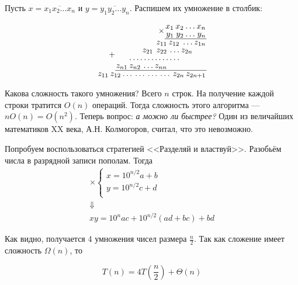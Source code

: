 \documentclass[a4paper,12pt]{article}
\begin{document}
Пусть $x = \overline{x_1 x_2 \ldots x_n}$ и $y = \overline{y_1 y_2 \ldots y_n}$. Распишем их умножение в столбик:
\begin{center}
	\[
	\renewcommand{\arraystretch}{0.8}
	\arraycolsep=1pt
	\begin{array}{r}
	\times\begin{array}{rrrr}
	x_1 & x_2 & \ldots & x_n \\
	y_1 & y_2 & \ldots & y_n \\
	\hline
	\end{array}
	\\
	+\begin{array}{rrrrrrr}
	& & & z_{11} & z_{12} & \ldots & z_{1n} \\
	& & z_{21} & z_{22} & \ldots & z_{2n} & \\
	& \hdotsfor{4} & & \\
	z_{n1} & z_{n2} & \ldots & z_{nn} & & & \\
	\hline
	\end{array}
	\\
	\begin{array}{rrrrrrrr}
	z_{11} & z_{12} & \dots & \dots & \dots & \dots & z_{2n} & z_{2n+1} \\
	\end{array}
	\end{array}\]
\end{center}


Какова сложность такого умножения? Всего $n$ строк. На получение каждой строки тратится $O(n)$ операций. Тогда сложность этого алгоритма --- $nO(n) = O(n^2)$. Теперь вопрос: \emph{а можно ли быстрее?} Один из величайших математиков XX века, А.Н. Колмогоров, считал, что это невозможно.

Попробуем воспользоваться стратегией <<Разделяй и властвуй>>. Разобьём числа в разрядной записи пополам. Тогда
\[\begin{array}{c}
\times \begin{cases}
x = 10^{n/2}a + b\\
y = 10^{n/2}c + d\\
\end{cases} \\
\Downarrow\\
xy = 10^{n}ac + 10^{n/2}(ad+bc)+bd
\end{array}\]

Как видно, получается 4 умножения чисел размера $\frac{n}{2}$. Так как сложение имеет сложность $\Omega(n)$, то

\[T(n) = 4T\left( \frac{n}{2} \right) + \Theta(n)\]
\end{document}
